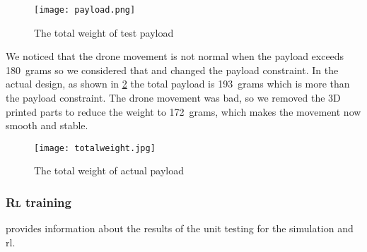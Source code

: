 \documentclass[../main.tex]{subfiles}
\begin{document}
\begin{figure}[tbp]
	\centering
	\texttt{[image: payload.png]}
	\caption{The total weight of test payload}
	\label{fig:payload}
\end{figure} 

We noticed that the drone movement
is not normal when the payload exceeds \SI{180}{grams} 
so we considered that and changed
the payload constraint. In the actual design, as shown in 
\cref{fig:actual-total-weight} the total payload 
is \SI{193}{grams} which is more than the payload constraint. 
The drone movement was bad, so we removed the 3D printed
parts to reduce the weight to \SI{172}{grams}, 
which makes the movement now smooth and stable.

\begin{figure}[H]
	\centering
	\texttt{[image: totalweight.jpg]}
	\caption{The total weight of actual payload}
	\label{fig:actual-total-weight}
\end{figure} 

\subsubsection{\textsc{Rl} training}

 provides information about the results
of the unit testing for the simulation and \gls{rl}.
\end{document}
